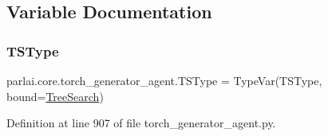 \subsection{Variable Documentation}
\mbox{\label{namespaceparlai_1_1core_1_1torch__generator__agent_a0526ff67eb4bc600cb8caa4a561ebb6f}} 
\subsubsection{\texorpdfstring{T\+S\+Type}{TSType}}
{\footnotesize\ttfamily parlai.\+core.\+torch\+\_\+generator\+\_\+agent.\+T\+S\+Type = Type\+Var(\textquotesingle{}T\+S\+Type\textquotesingle{}, bound=\textquotesingle{}\hyperlink{classparlai_1_1core_1_1torch__generator__agent_1_1TreeSearch}{Tree\+Search}\textquotesingle{})}



Definition at line 907 of file torch\+\_\+generator\+\_\+agent.\+py.

